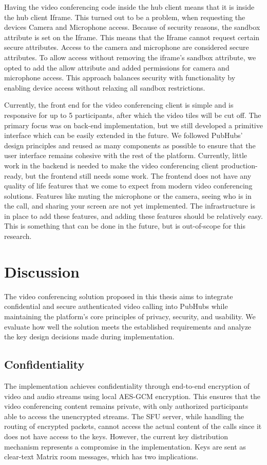\documentclass{report}
\begin{document}
Having the video conferencing code inside the hub client means that it is inside the hub client Iframe.
This turned out to be a problem, when requesting the devices Camera and Microphone access. Because of security reasons, the
sandbox attribute is set on the Iframe. This means that the Iframe cannot request certain secure attributes.
Access to the camera and microphone are considered secure attributes.
To allow access without removing the iframe’s sandbox attribute, we opted to add the allow attribute and added
permissions for camera and microphone access.
This approach balances security with functionality by enabling device access without relaxing all sandbox restrictions.

Currently, the front end for the video conferencing client is simple and is responsive for up to 5 participants, after which
the video tiles will be cut off.
The primary focus was on back-end implementation, but we still developed a primitive interface which can be easily
extended in the future.
We followed PubHubs’ design principles and reused as many components as possible to ensure that the user interface
remains cohesive with the rest of the platform. Currently, little work in the backend is needed to make the video
conferencing client production-ready, but the frontend still needs some work. The frontend does not have any quality
of life features that we come to expect from modern video conferencing solutions. Features like muting the
microphone or the camera, seeing who is in the call, and sharing your screen are not yet implemented. The
infrastructure is in place to add these features, and adding these features should be relatively easy. This is
something that can be done in the future, but is out-of-scope for this research.

\chapter{Discussion}
The video conferencing solution proposed in this thesis aims to integrate confidential and secure authenticated video
calling into PubHubs while maintaining the platform's core principles of privacy, security, and usability. We evaluate
how well the solution meets the established requirements and analyze the key design decisions made during
implementation.

\section{Confidentiality}
The implementation achieves confidentiality through end-to-end encryption of video and audio streams using local
AES-GCM encryption. This ensures that the video conferencing content remains private, with only authorized
participants able to access the unencrypted streams. The SFU server, while handling the routing of encrypted
packets, cannot access the actual content of the calls since it does not have access to the keys. However, the current
key distribution mechanism represents a compromise in the implementation. Keys are sent as
clear-text Matrix room messages, which has two implications.
\end{document}
